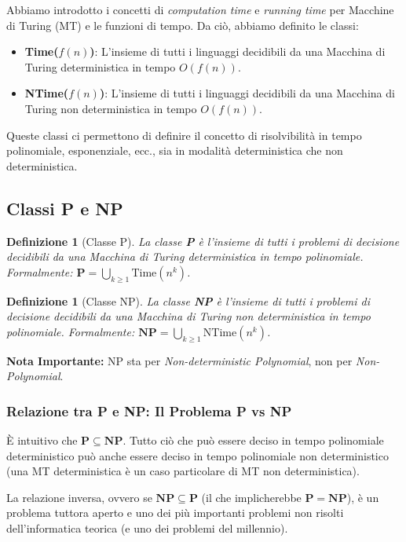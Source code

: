 \documentclass[a4paper, 11pt]{book} %
\newtheorem{definition}[theorem]{Definizione}
\theoremstyle{definition}
\begin{document}
Abbiamo introdotto i concetti di \emph{computation time} e \emph{running time} per Macchine di Turing (MT) e le funzioni di tempo. Da ciò, abbiamo definito le classi:
\begin{itemize}
    \item \textbf{Time($f(n)$)}: L'insieme di tutti i linguaggi decidibili da una Macchina di Turing deterministica in tempo $O(f(n))$.
    \item \textbf{NTime($f(n)$)}: L'insieme di tutti i linguaggi decidibili da una Macchina di Turing non deterministica in tempo $O(f(n))$.
\end{itemize}

Queste classi ci permettono di definire il concetto di risolvibilità in tempo polinomiale, esponenziale, ecc., sia in modalità deterministica che non deterministica.

\subsection{Classi P e NP}

\begin{definition}[Classe P]
La classe \textbf{P} è l'insieme di tutti i problemi di decisione decidibili da una Macchina di Turing deterministica in tempo polinomiale.
Formalmente: $\mathbf{P} = \bigcup_{k \ge 1} \text{Time}(n^k)$.
\end{definition}

\begin{definition}[Classe NP]
La classe \textbf{NP} è l'insieme di tutti i problemi di decisione decidibili da una Macchina di Turing non deterministica in tempo polinomiale.
Formalmente: $\mathbf{NP} = \bigcup_{k \ge 1} \text{NTime}(n^k)$.
\end{definition}

\textbf{Nota Importante:} NP sta per \emph{Non-deterministic Polynomial}, non per \emph{Non-Polynomial}.

\subsubsection{Relazione tra P e NP: Il Problema P vs NP}

È intuitivo che $\mathbf{P} \subseteq \mathbf{NP}$. Tutto ciò che può essere deciso in tempo polinomiale deterministico può anche essere deciso in tempo polinomiale non deterministico (una MT deterministica è un caso particolare di MT non deterministica).

La relazione inversa, ovvero se $\mathbf{NP} \subseteq \mathbf{P}$ (il che implicherebbe $\mathbf{P} = \mathbf{NP}$), è un problema tuttora aperto e uno dei più importanti problemi non risolti dell'informatica teorica (e uno dei problemi del millennio).
\end{document}
